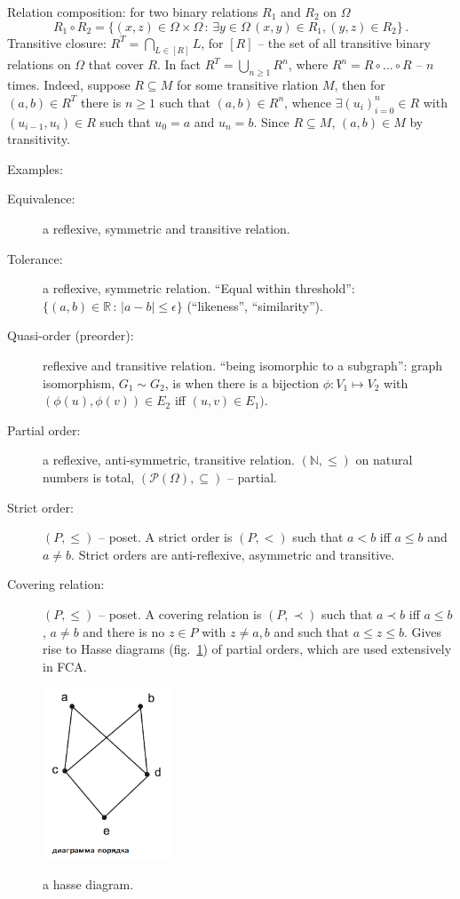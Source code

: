 \documentclass[a4paper]{article}
\begin{document}
\noindent Relation composition: for two binary relations $R_1$ and $R_2$ on $\Omega$
$$ R_1\circ R_2
    = \{(x,z)\in \Omega\times\Omega
        \,:\, \exists y\in \Omega\, (x,y)\in R_1, (y,z)\in R_2\}
    \,. $$
\noindent Transitive closure:
$R^T = \bigcap_{L\in [R]} L$, for $[R]$ -- the set of all transitive binary
relations on $\Omega$ that cover $R$. In fact $R^T = \bigcup_{n\geq1} R^n$,
where $R^n = R\circ \ldots \circ R$ -- $n$ times. Indeed, suppose $R\subseteq M$
for some transitive rlation $M$, then for $(a,b)\in R^T$ there is $n\geq 1$
such that $(a,b)\in R^n$, whence $\exists (u_i)_{i=0}^n\in R$ with $(u_{i-1}, u_i)\in R$
such that $u_0=a$ and $u_n=b$. Since $R\subseteq M$, $(a,b)\in M$ by transitivity.

\noindent Examples: \begin{description}
    \item[Equivalence:] a reflexive, symmetric and transitive relation.
    \item[Tolerance:] a reflexive, symmetric relation.
    ``Equal within threshold'': $\{(a,b)\in \mathbb{R}\,:\, |a-b|\leq \epsilon\}$
    (``likeness'', ``similarity'').
    \item[Quasi-order (preorder):] reflexive and transitive relation.
    ``being isomorphic to a subgraph'': graph isomorphism, $G_1 \sim G_2$, is when
    there is a bijection $\phi:V_1\mapsto V_2$ with $(\phi(u),\phi(v))\in E_2$ iff
    $(u,v)\in E_1)$.
    \item[Partial order:] a reflexive, anti-symmetric, transitive relation.
    $(\mathbb{N}, \leq)$ on natural numbers is total, $(\mathcal{P}(\Omega),
    \subseteq)$ -- partial.
    \item[Strict order:] $(P, \leq)$ -- poset. A strict order is $(P, <)$ such
    that $a<b$ iff $a\leq b$ and $a\neq b$. Strict orders are anti-reflexive,
    asymmetric and transitive.
    \item[Covering relation:] $(P, \leq)$ -- poset. A covering relation is $(P, \prec)$
    such that $a\prec b$ iff $a\leq b$, $a\neq b$ and there is no $z\in P$ with $z\neq a,b$
    and such that $a\leq z\leq b$. Gives rise to Hasse diagrams (fig.~\ref{fig:hasse})
    of partial orders, which are used extensively in FCA.
\end{description}
\begin{figure}
    \centering
    \includegraphics[width=0.35\textwidth]{hasse.png}
    \label{fig:hasse}
    \caption{a hasse diagram.}
\end{figure}
\end{document}
